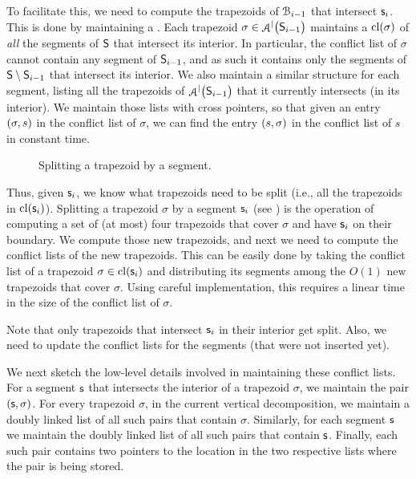 To facilitate this, we need to compute the trapezoids of $\EuScript{B}_{i-1}$
that intersect $\mathsf{s}_i$. This is done by maintaining a .  Each trapezoid $\sigma \in \ArrVD{\bigl.\SegSet_{i-1}}$
maintains a  ${\mathrm{cl}}(\sigma)$ of \emph{all} the
segments of $\mathsf{S}$ that intersect its interior.  In particular, the
conflict list of $\sigma$ cannot contain any segment of
$\mathsf{S}_{i-1}$, and as such it contains only the segments of $\mathsf{S}
\setminus \mathsf{S}_{i-1}$ that intersect its interior.  We also
maintain a similar structure for each segment, listing all the
trapezoids of $\ArrVD{\bigl.\SegSet_{i-1}}$ that it currently
intersects (in its interior). We maintain those lists with cross
pointers, so that given an entry $(\sigma, s)$ in the conflict list of
$\sigma$, we can find the entry $(s,\sigma)$ in the conflict list of
$s$ in constant time.

\begin{figure}[t]
    \centering
    \caption{Splitting a trapezoid by a segment.}
\end{figure}

Thus, given $\mathsf{s}_i$, we know what trapezoids need to be split (i.e.,
all the trapezoids in ${\mathrm{cl}}(\mathsf{s}_i)$).  Splitting a trapezoid $\sigma$
by a segment $\mathsf{s}_i$ (see ) is the operation of computing a set of (at most)
four trapezoids that cover $\sigma$ and have $\mathsf{s}_i$ on their
boundary.  We compute those new trapezoids, and next we need to
compute the conflict lists of the new trapezoids. This can be easily
done by taking the conflict list of a trapezoid $\sigma \in
{\mathrm{cl}}(\mathsf{s}_i)$ and distributing its segments among the $O(1)$ new
trapezoids that cover $\sigma$. Using careful implementation, this
requires a linear time in the size of the conflict list of $\sigma$.

Note that only trapezoids that intersect $\mathsf{s}_i$ in their interior
get split. Also, we need to update the conflict lists for the segments
(that were not inserted yet).

We next sketch the low-level details involved in maintaining these
conflict lists.  For a segment $\mathsf{s}$ that intersects the interior of
a trapezoid $\sigma$, we maintain the pair $(\mathsf{s},\sigma)$. For every
trapezoid $\sigma$, in the current vertical decomposition, we maintain
a doubly linked list of all such pairs that contain $\sigma$.
Similarly, for each segment $\mathsf{s}$ we maintain the doubly linked list
of all such pairs that contain $\mathsf{s}$. Finally, each such pair
contains two pointers to the location in the two respective lists
where the pair is being stored.

